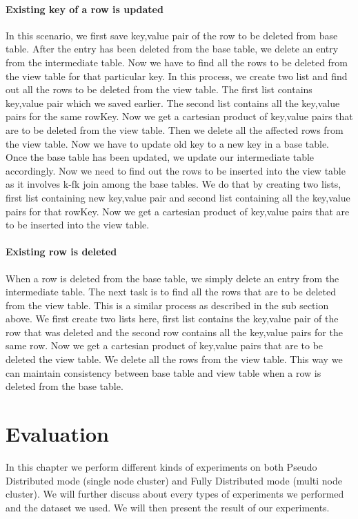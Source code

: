\documentclass[11pt,a4paper,bibtotoc,idxtotoc,headsepline,footsepline,footexclude,BCOR12mm,DIV13]{scrbook}
\begin{document}
\subsubsection{Existing key of a row is updated}
In this scenario, we first save key,value pair of the row to be deleted from base table. After the entry has been deleted from the base table, we delete an entry from the intermediate table. Now we have to find all the rows to be deleted from the view table for that particular key. In this process, we create two list and find out all the rows to be deleted from the view table. The first list contains key,value pair which we saved earlier. The second list contains all the key,value pairs for the same rowKey. Now we get a cartesian product of key,value pairs that are to be deleted from the view table. Then we delete all the affected rows from the view table. Now we have to update old key to a new key in a base table. Once the base table has been updated, we update our intermediate table accordingly. Now we need to find out the rows to be inserted into the view table as it involves k-fk join among the base tables. We do that by creating two lists, first list containing new key,value pair and second list containing all the key,value pairs for that rowKey. Now we get a cartesian product of key,value pairs that are to be inserted into the view table.

\subsubsection{Existing row is deleted}
When a row is deleted from the base table, we simply delete an entry from the intermediate table. The next task is to find all the rows that are to be deleted from the view table. This is a similar process as described in the sub section above. We first create two lists here, first list contains the key,value pair of the row that was deleted and the second row contains all the key,value pairs for the same row. Now we get a cartesian product of key,value pairs that are to be deleted the view table. We delete all the rows from the view table. This way we can maintain consistency between base table and view table when a row is deleted from the base table.

\newpage
\chapter{Evaluation}
\label{Evaluation}
In this chapter we perform different kinds of experiments on both Pseudo Distributed mode (single node cluster) and Fully Distributed mode (multi node cluster). We will further discuss about every types of experiments we performed and the dataset we used. We will then present the result of our experiments.
\end{document}
